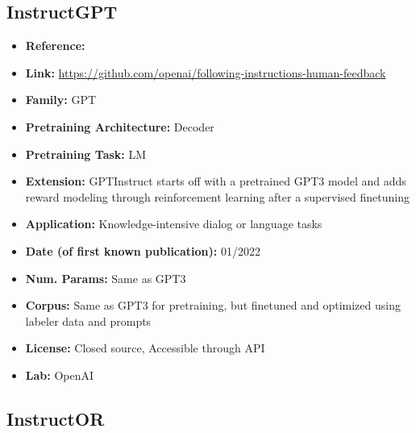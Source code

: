 \documentclass{article}
\begin{document}
\subsection{InstructGPT}
            \begin{itemize}
                \item \textbf{Reference:} 
                \item \textbf{Link:} \url{https://github.com/openai/following-instructions-human-feedback}
                \item \textbf{Family:} GPT 
                \item \textbf{Pretraining Architecture:} Decoder
                \item \textbf{Pretraining Task:} LM
                \item \textbf{Extension:} GPTInstruct starts off with a pretrained GPT3 model and adds reward modeling through reinforcement learning after a supervised finetuning  
                \item \textbf{Application:} Knowledge-intensive dialog or language tasks
                \item \textbf{Date (of first known publication):} 01/2022
                \item \textbf{Num. Params:} Same as GPT3
                \item \textbf{Corpus:} Same as GPT3 for pretraining, but finetuned and optimized using labeler data and prompts
                \item \textbf{License:} Closed source, Accessible through API
                \item \textbf{Lab:} OpenAI
            \end{itemize}
            
\subsection{InstructOR}
\end{document}
